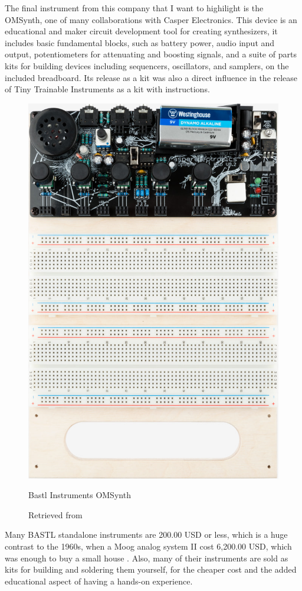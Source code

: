 The final instrument from this company that I want to highilight is the OMSynth, one of many collaborations with Casper Electronics. This device is an educational and maker circuit development tool for creating synthesizers, it includes basic fundamental blocks, such as battery power, audio input and output, potentiometers for attenuating and boosting signals, and a suite of parts kits for building devices including sequencers, oscillators, and samplers, on the included breadboard. Its release as a kit was also a direct influence in the release of Tiny Trainable Instruments as a kit with instructions.

\begin{figure}[ht]
  \centering
  \includegraphics[width=0.75\linewidth,height=0.25\textheight,keepaspectratio]{images/bastl-omsynth.jpg}
  \caption{Bastl Instruments OMSynth}
  \caption*{Retrieved from \cite{website-bastl-instruments-current}}
  \label{fig:bastl-omsynth}
\end{figure}

Many BASTL standalone instruments are 200.00 USD or less, which is a huge contrast to the 1960s, when a Moog analog system II cost 6,200.00 USD, which was enough to buy a small house \cite{analog-days}. Also, many of their instruments are sold as kits for building and soldering them yourself, for the cheaper cost and the added educational aspect of having a hands-on experience.

